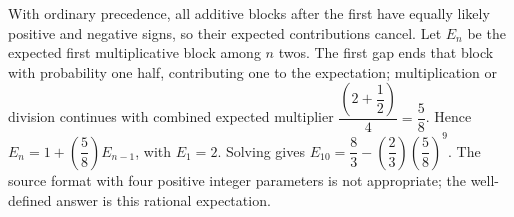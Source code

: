 With ordinary precedence, all additive blocks after the first have equally likely positive and negative signs, so their expected contributions cancel. Let $E_n$ be the expected first multiplicative block among $n$ twos. The first gap ends that block with probability one half, contributing one to the expectation; multiplication or division continues with combined expected multiplier $\dfrac{(2+\dfrac{1}{2})}{4}=\dfrac{5}{8}$. Hence $E_n=1+(\dfrac{5}{8})E_{n-1}$, with $E_1=2$. Solving gives $E_{10}=\dfrac{8}{3}-(\dfrac{2}{3})(\dfrac{5}{8})^9$. The source format with four positive integer parameters is not appropriate; the well-defined answer is this rational expectation.
